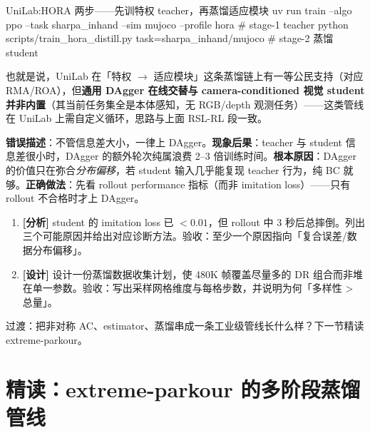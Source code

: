 \begin{codebox}[bash]{UniLab:HORA 两步——先训特权 teacher，再蒸馏适应模块}
uv run train --algo ppo --task sharpa_inhand --sim mujoco --profile hora  # stage-1 teacher
python scripts/train_hora_distill.py task=sharpa_inhand/mujoco            # stage-2 蒸馏 student
\end{codebox}

也就是说，UniLab 在「特权 $\to$ 适应模块」这条蒸馏链上有一等公民支持（对应 RMA/ROA），但\textbf{通用 DAgger 在线交替与 camera-conditioned 视觉 student 并非内置}（其当前任务集全是本体感知，无 RGB/depth 观测任务）——这类管线在 UniLab 上需自定义循环，思路与上面 RSL-RL 段一致。

\begin{pitfall}
\textbf{错误描述}：不管信息差大小，一律上 DAgger。\textbf{现象后果}：teacher 与 student 信息差很小时，DAgger 的额外轮次纯属浪费 2--3 倍训练时间。\textbf{根本原因}：DAgger 的价值只在弥合\emph{分布偏移}，若 student 输入几乎能复现 teacher 行为，纯 BC 就够。\textbf{正确做法}：先看 rollout performance 指标（而非 imitation loss）——只有 rollout 不合格时才上 DAgger。
\end{pitfall}

\begin{practice}[本节练习]
\begin{enumerate}
  \item \textbf{[分析]} student 的 imitation loss 已 $<0.01$，但 rollout 中 3 秒后总摔倒。列出三个可能原因并给出对应诊断方法。验收：至少一个原因指向「复合误差/数据分布偏移」。
  \item \textbf{[设计]} 设计一份蒸馏数据收集计划，使 480K 帧覆盖尽量多的 DR 组合而非堆在单一参数。验收：写出采样网格维度与每格步数，并说明为何「多样性 > 总量」。
\end{enumerate}
\end{practice}

过渡：把非对称 AC、estimator、蒸馏串成一条工业级管线长什么样？下一节精读 extreme-parkour。

\section{精读：extreme-parkour 的多阶段蒸馏管线}
\label{sec:rlmc-priv-parkour}

